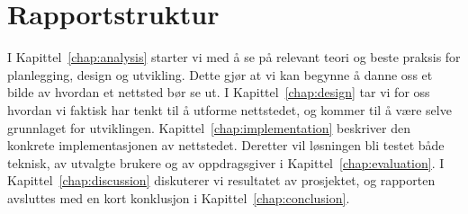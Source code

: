 \section{Rapportstruktur}



I Kapittel~\ref{chap:analysis} starter vi med å se på relevant teori og beste praksis for planlegging, design og utvikling. Dette gjør at vi kan begynne å danne oss et bilde av hvordan et nettsted bør se ut. I Kapittel~\ref{chap:design} tar vi for oss hvordan vi faktisk har tenkt til å utforme nettstedet, og kommer til å være selve grunnlaget for utviklingen. Kapittel~\ref{chap:implementation} beskriver den konkrete implementasjonen av nettstedet. Deretter vil løsningen bli testet både teknisk, av utvalgte brukere og av oppdragsgiver i Kapittel~\ref{chap:evaluation}. I Kapittel~\ref{chap:discussion} diskuterer vi resultatet av prosjektet, og rapporten avsluttes med en kort konklusjon i Kapittel~\ref{chap:conclusion}.
